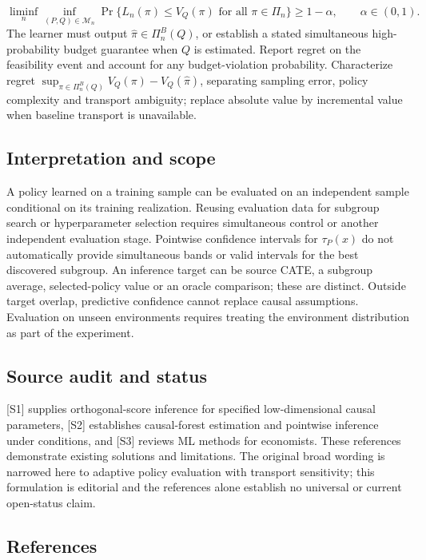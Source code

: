 \documentclass[11pt,a4paper]{article}
\begin{document}
\[
\liminf_n\inf_{(P,Q)\in\mathcal M_n}
\Pr\{L_n(\pi)\le V_Q(\pi)\text{ for all }\pi\in\Pi_n\}
\ge1-\alpha,\qquad\alpha\in(0,1).
\]
The learner must output $\widehat\pi\in\Pi_n^B(Q)$, or establish a stated simultaneous high-probability budget guarantee when $Q$ is estimated. Report regret on the feasibility event and account for any budget-violation probability. Characterize regret $\sup_{\pi\in\Pi_n^B(Q)}V_Q(\pi)-V_Q(\widehat\pi)$, separating sampling error, policy complexity and transport ambiguity; replace absolute value by incremental value when baseline transport is unavailable.

\subsection*{Interpretation and scope}

A policy learned on a training sample can be evaluated on an independent sample conditional on its training realization. Reusing evaluation data for subgroup search or hyperparameter selection requires simultaneous control or another independent evaluation stage. Pointwise confidence intervals for $\tau_P(x)$ do not automatically provide simultaneous bands or valid intervals for the best discovered subgroup. An inference target can be source CATE, a subgroup average, selected-policy value or an oracle comparison; these are distinct. Outside target overlap, predictive confidence cannot replace causal assumptions. Evaluation on unseen environments requires treating the environment distribution as part of the experiment.

\subsection*{Source audit and status}

[S1] supplies orthogonal-score inference for specified low-dimensional causal parameters, [S2] establishes causal-forest estimation and pointwise inference under conditions, and [S3] reviews ML methods for economists. These references demonstrate existing solutions and limitations. The original broad wording is narrowed here to adaptive policy evaluation with transport sensitivity; this formulation is editorial and the references alone establish no universal or current open-status claim.

\subsection*{References}
\end{document}
